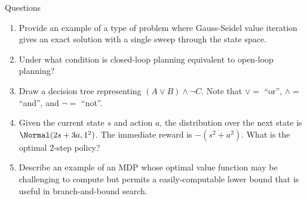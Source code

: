 \documentclass[handout]{dmu}
\begin{document}
\begin{frame}{Questions}
\begin{enumerate}
\conti
\item Provide an example of a type of problem where Gauss-Seidel value iteration gives an exact solution with a single sweep through the state space.
\item Under what condition is closed-loop planning equivalent to open-loop planning?
\item Draw a decision tree representing $(A \vee B) \wedge \neg C$. Note that $\vee =$ ``or'', $\wedge =$ ``and'', and $\neg = $ ``not''.
\item Given the current state $s$ and action $a$, the distribution over the next state is $\Normal(2s + 3a, 1^2)$. The immediate reward is $-(s^2 + a^2)$. What is the optimal 2-step policy?
\item Describe an example of an MDP whose optimal value function may be challenging to compute but permits a easily-computable lower bound that is useful in branch-and-bound search.
\end{enumerate}
\end{frame}
\end{document}
